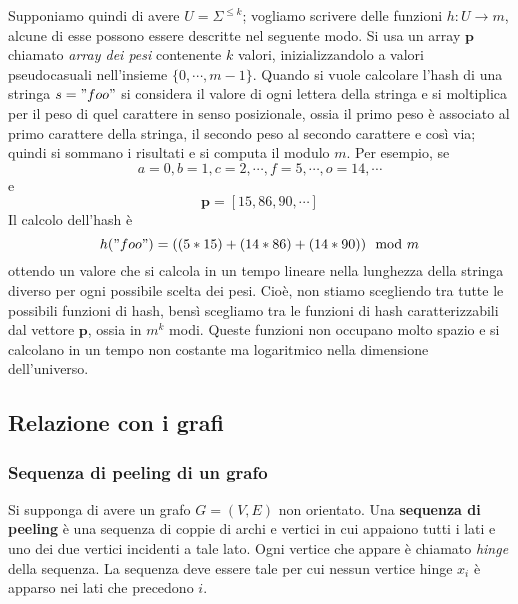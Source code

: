 Supponiamo quindi di avere $U = \Sigma^{\leq k}$; vogliamo scrivere delle
funzioni $h: U \rightarrow m$, alcune di esse possono essere descritte nel
seguente modo.
Si usa un array $\mathbf{p}$ chiamato \textit{array dei pesi} contenente $k$ valori,
inizializzandolo a valori pseudocasuali nell'insieme $\{0, \cdots, m-1\}$.
Quando si vuole calcolare l'hash di una stringa $s = "foo"$ si considera il valore
di ogni lettera della stringa e si moltiplica per il peso di quel carattere
in senso posizionale, ossia il primo peso è associato al primo carattere della stringa,
il secondo peso al secondo carattere e così via; quindi si sommano i risultati e
si computa il modulo $m$. Per esempio, se
$$
	a = 0, b = 1, c = 2, \cdots, f = 5, \cdots, o = 14, \cdots
$$
e
$$
	\mathbf{p} = [15, 86, 90, \cdots]
$$
Il calcolo dell'hash è
$$
	h("foo") = ((5 * 15) + (14 * 86) + (14*90)) \mod m
$$
ottendo un valore che si calcola in un tempo lineare nella lunghezza della stringa
diverso per ogni possibile scelta dei pesi. Cioè, non stiamo
scegliendo tra tutte le possibili funzioni di hash, bensì scegliamo tra le funzioni
di hash caratterizzabili dal vettore $\mathbf{p}$, ossia in $m^k$ modi.
Queste funzioni non occupano molto spazio e si calcolano in un tempo non
costante ma logaritmico nella dimensione dell'universo.

\subsection{Relazione con i grafi}
\subsubsection{Sequenza di peeling di un grafo}
Si supponga di avere un grafo $G = (V,E)$ non orientato. Una \textbf{sequenza di peeling} è
una sequenza di coppie di archi e vertici in cui appaiono tutti i lati e uno dei
due vertici incidenti a tale lato. Ogni vertice che appare è chiamato \textit{hinge}
della sequenza. La sequenza deve essere tale per cui nessun vertice hinge $x_i$
è apparso nei lati che precedono $i$.

